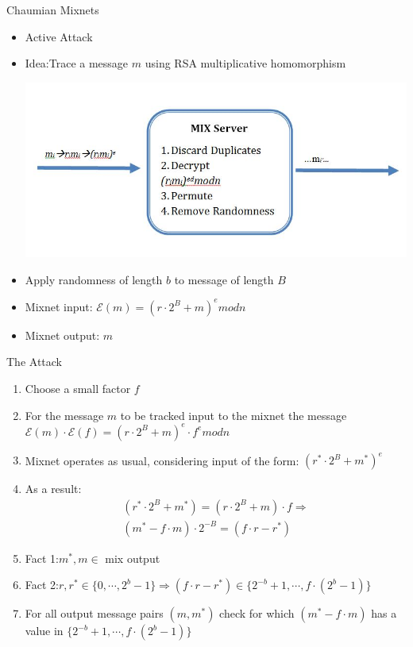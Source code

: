 \documentclass{beamer}
\begin{document}
\begin{frame}[allowframebreaks]{Chaumian Mixnets}
\begin{itemize}
\item Active Attack 
\item Idea:Trace a message $m$ using RSA multiplicative homomorphism
\begin{center}
\includegraphics[scale=0.3]{chaumian.jpg}
\end{center}
\item Apply randomness of length $b$ to message of length $B$
\item Mixnet input: $\mathcal{E}(m) = (r \cdot 2^B + m)^e mod n$
\item Mixnet output: $m$
\end{itemize}
\begin{block}{The Attack}
\begin{small}
\begin{enumerate} 
\item Choose a small factor $f$
\item For the message $m$ to be tracked input to the mixnet the message 
$\mathcal{E}(m) \cdot \mathcal{E}(f) = (r \cdot 2^B + m)^e \cdot f^e mod n$
\item Mixnet operates as usual, considering input of the form: $(r^* \cdot 2^B + m^*)^e$
\item As a result: 
\begin{align*}
(r^* \cdot 2^B + m^*) = (r \cdot 2^B + m) \cdot f  \Rightarrow \\
(m^* - f \cdot m) \cdot 2^{-B} = (f \cdot r  -  r^*)
\end{align*}
\item Fact 1:$m^*, m \in$ mix output
\item Fact 2:$r,r^* \in \{0, \cdots, 2^b - 1\} \Rightarrow (f \cdot r  -  r^*) \in  \{2^{-b} + 1, \cdots, f \cdot (2^b - 1)\}$
\item For all output message pairs $(m,m^*)$ check for which $(m^* - f \cdot m)$ has a value in $\{2^{-b} + 1, \cdots, f \cdot (2^b - 1)\}$
\end{enumerate} 
\end{small}
\end{block}
\end{frame}
\end{document}
